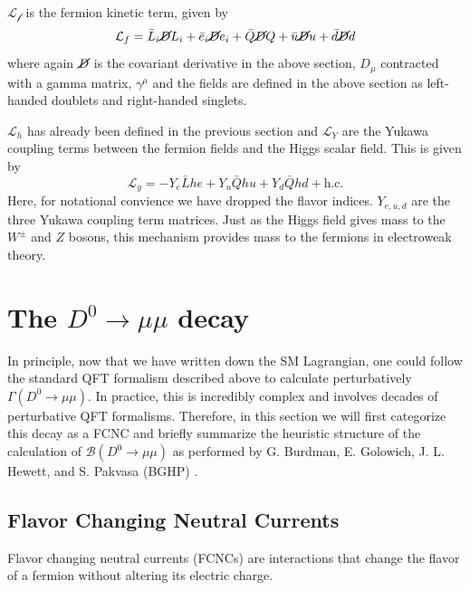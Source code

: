 $\mathcal{L_f}$ is the fermion kinetic term, given by
\begin{equation}
\mathcal{L}_{f} = \bar{L}_{i}\cancel{D}L_{i} + \bar{e}_{i}\cancel{D}e_{i} + \bar{Q}\cancel{D}Q + \bar{u} \cancel{D}u + \bar{d}\cancel{D}d
\label{eq:fermion_kinetic_term}
\end{equation}
where again $\cancel{D}$ is the covariant derivative in the above section, $D_\mu$ contracted with a gamma matrix, $\gamma^\mu$ and the fields are defined in the above section as left-handed doublets and right-handed singlets.

$\mathcal{L}_h$ has already been defined in the previous section and $\mathcal{L}_Y$ are the Yukawa coupling terms between the fermion fields and the Higgs scalar field. This is given by
\begin{equation}
\mathcal{L}_{y} = - Y_{e} \bar{L}he + Y_{u}\bar{Q}h u + Y_{d} \bar{Q}h d
 + \text{h.c.}
\end{equation}
Here, for notational convience we have dropped the flavor indices. $Y_{e,u,d}$ are the three Yukawa coupling term matrices. Just as the Higgs field gives mass to the $W^\pm$ and $Z$ bosons, this mechanism provides mass to the fermions in electroweak theory. 

\section{The $D^0 \to \mu \mu$ decay}

In principle, now that we have written down the SM Lagrangian, one could follow the standard QFT formalism described above to calculate perturbatively $\Gamma(D^0 \to \mu \mu)$. In practice, this is incredibly complex and involves decades of perturbative QFT formalisms. Therefore, in this section we will first categorize this decay as a FCNC and briefly summarize the heuristic structure of the calculation of $\mathcal{B}(D^0 \to \mu \mu)$ as performed by G. Burdman, E. Golowich, J. L. Hewett, and S. Pakvasa (BGHP) \cite{ref:burdman_2002}.

\subsection{Flavor Changing Neutral Currents}

Flavor changing neutral currents (FCNCs) are interactions that change the flavor of a fermion without altering its electric charge. 

